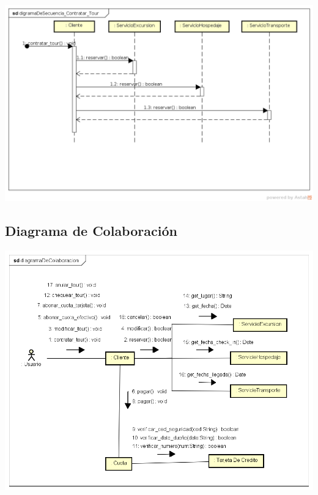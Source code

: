 \documentclass[12pt,a4paper]{article}
\begin{document}
		\includegraphics[scale=0.6]{digramaDeSecuencia_Contratar_Tour.png}

	\subsection{Diagrama de Colaboración}
		\includegraphics[scale=0.7]{diagramaDeColaboracion.png}
\end{document}
